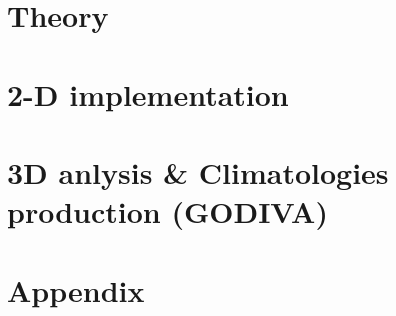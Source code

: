 



\nocite{*} 				%
\frontmatter


\pagestyle{plain}




\dominitoc
\setcounter{tocdepth}{1}
\tableofcontents

\mainmatter
\pagestyle{fancy}



\thispagestyle{empty}
\part{\diva Theory}








\thispagestyle{empty}
\part{2-D implementation}









\thispagestyle{empty}
\part{3D anlysis \& Climatologies production (GODIVA)}



\thispagestyle{empty}
\part{Appendix}
\appendix




\pagestyle{plain}





\listoffigures
\listoftables
\printindex


	
	

